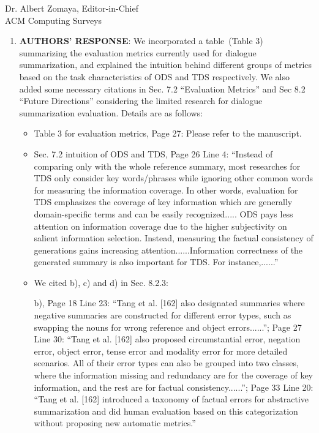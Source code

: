 \documentclass[11pt]{letter} %
\begin{document}
\begin{letter}{
Dr. Albert Zomaya, Editor-in-Chief  \\
ACM Computing Surveys}
\begin{enumerate}
	\quad c) [EMNLP 2022, for dialogue summarization faithfulness evaluation]: Analyzing and Evaluating Faithfulness in Dialogue Summarization. 
	
	\quad d) [NAACL 2022, discussion on dialogue evaluation metrics]: DialSummEval: Revisiting Summarization Evaluation for Dialogues
	
	\item[] \textbf{AUTHORS' RESPONSE}: We incorporated a table~(Table 3) summarizing the evaluation metrics currently used for dialogue summarization, and explained the intuition behind different groups of metrics based on the task characteristics of ODS and TDS respectively. We also added some necessary citations in Sec. 7.2 ``Evaluation Metrics'' and Sec 8.2 ``Future Directions'' considering the limited research for dialogue summarization evaluation. Details are as follows:
		\begin{itemize}
			\item Table 3 for evaluation metrics, Page 27: Please refer to the manuscript.
				
			\item Sec. 7.2 intuition of ODS and TDS, Page 26 Line 4: ``Instead of comparing only with the whole reference summary, most researches for TDS only consider key words/phrases while ignoring other common words for measuring the information coverage. In other words, evaluation for TDS emphasizes the coverage of key information which are generally domain-specific terms and can be easily recognized..... ODS pays less attention on information coverage due to the higher subjectivity on salient information selection. Instead, measuring the factual consistency of generations gains increasing attention......Information correctness of the generated summary is also important for TDS. For instance,......''
			\item We cited b), c) and d) in Sec. 8.2.3: 
			
				
			\quad b), Page 18 Line 23: ``Tang et al. [162] also designated summaries where negative summaries are constructed for different error types, such as swapping the nouns for wrong reference and object errors......''; Page 27 Line 30: ``Tang et al. [162] also proposed circumstantial error, negation error, object error, tense error and modality error for more detailed scenarios. All of their error types can also be grouped into two classes, where the information missing and redundancy are for the coverage of key information, and the rest are for factual consistency......''; Page 33 Line 20: ``Tang et al. [162] introduced a taxonomy of factual errors for abstractive summarization and did human evaluation based on this categorization without proposing new automatic metrics.''
			

\end{itemize}
\end{enumerate}
\end{letter}
\end{document}
